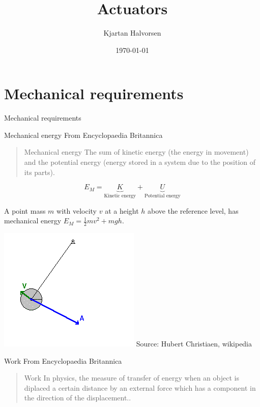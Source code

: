 \documentclass[presentation,aspectratio=169]{beamer}
\author{Kjartan Halvorsen}
\date{\today}
\title{Actuators}
\begin{document}
\maketitle

\section{Mechanical requirements}
\label{sec:orgaf21477}

\begin{frame}[label={sec:org30366de}]{Mechanical requirements}
\end{frame}
\begin{frame}[label={sec:orgc9667c5}]{Mechanical energy}
From Encyclopaedia Britannica
\begin{quote}
\alert{Mechanical energy} The sum of kinetic energy (the energy in movement) and the potential energy (energy stored in a system due to the position of its parts).
\end{quote}

\[ E_M = \underbrace{K}_{\text{Kinetic energy}} + \underbrace{U}_{\text{Potential energy}}\]

\pause
A point mass \(m\) with velocity \(v\) at a height \(h\) above the reference level, has mechanical energy \(E_M = \frac{1}{2}mv^2 + mgh\).

\begin{center}
\includegraphics[height=0.3\textheight]{../../figures/pendulum.png}
{\footnotesize Source: Hubert Christiaen, wikipedia}
\end{center}
\end{frame}


\begin{frame}[label={sec:org2fde100}]{Work}
From Encyclopaedia Britannica
\begin{quote}
\alert{Work} In physics, the measure of \alert{transfer of energy} when an object is diplaced \alert{a certain distance} by an \alert{external force} which has a component in the direction of the displacement..
\end{quote}
\end{frame}
\end{document}
